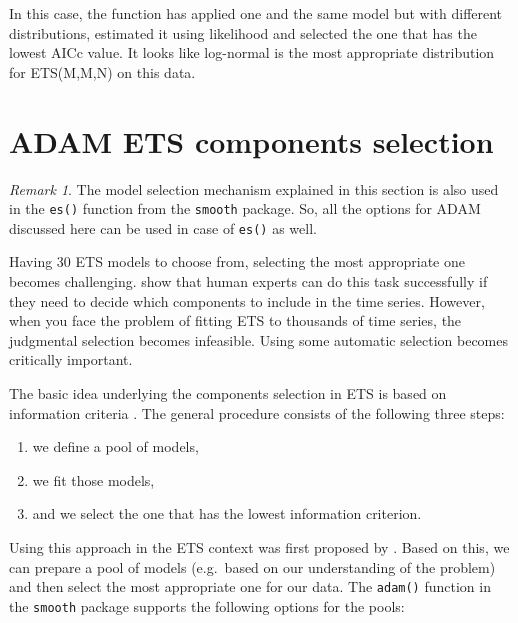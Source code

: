 \documentclass[
]{book}
\providecommand{\tightlist}{%
  \setlength{\itemsep}{0pt}\setlength{\parskip}{0pt}}
\theoremstyle{definition}
\theoremstyle{definition}
\theoremstyle{definition}
\theoremstyle{definition}
\theoremstyle{remark}
\newtheorem*{remark}{Remark}
\begin{document}
In this case, the function has applied one and the same model but with different distributions, estimated it using likelihood and selected the one that has the lowest AICc value. It looks like log-normal is the most appropriate distribution for ETS(M,M,N) on this data.

\hypertarget{ETSSelection}{%
\section{ADAM ETS components selection}\label{ETSSelection}}

\begin{remark}
The model selection mechanism explained in this section is also used in the \texttt{es()} function from the \texttt{smooth} package. So, all the options for ADAM discussed here can be used in case of \texttt{es()} as well.
\end{remark}

Having 30 ETS models to choose from, selecting the most appropriate one becomes challenging. \citet{Petropoulos2018a} show that human experts can do this task successfully if they need to decide which components to include in the time series. However, when you face the problem of fitting ETS to thousands of time series, the judgmental selection becomes infeasible. Using some automatic selection becomes critically important.

The basic idea underlying the components selection in ETS is based on information criteria \citep[Section 13.3 of][]{SvetunkovSBA}. The general procedure consists of the following three steps:

\begin{enumerate}
\def\labelenumi{\arabic{enumi}.}
\tightlist
\item
  we define a pool of models,
\item
  we fit those models,
\item
  and we select the one that has the lowest information criterion.
\end{enumerate}

Using this approach in the ETS context was first proposed by \citet{Hyndman2002}. Based on this, we can prepare a pool of models (e.g.~based on our understanding of the problem) and then select the most appropriate one for our data. The \texttt{adam()} function in the \texttt{smooth} package supports the following options for the pools:
\end{document}
